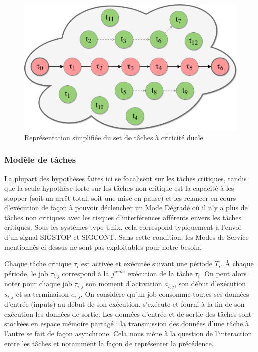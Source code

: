 \documentclass[french, a4paper, 11pt, twoside, pdftex]{StyleThese}
\begin{document}
    	\begin{figure}[th]
    		\centering
    		\includegraphics[width=0.8\linewidth]{schemas/SetDeTaches}
    		\caption{Représentation simplifiée du set de tâches à criticité duale}
    		\label{fig:SetdeTaches}
    	\end{figure}
    	
    	
    	\subsubsection{Modèle de tâches}
		La plupart des hypothèses faites ici se focalisent sur les tâches critiques, tandis que la seule hypothèse forte sur les tâches non critique est la capacité à les stopper (soit un arrêt total, soit une mise en pause) et les relancer en cours d'exécution de façon à pouvoir déclencher un Mode Dégradé où il n'y a plus de tâches non critiques avec les risques d'interférences afférents envers les tâches critiques. Sous les systèmes type Unix, cela correspond typiquement à l'envoi d'un signal SIGSTOP et SIGCONT. Sans cette condition, les Modes de Service mentionnés ci-dessus ne sont pas exploitables pour notre besoin. 
		
		Chaque tâche critique $\tau_i$ est activée et exécutée suivant une période $T_i$. 
		À chaque période, le job $\tau_{i,j}$ correspond à la $j^{ieme}$ exécution de la tâche $\tau_i$. 
		On peut alors noter pour chaque job $\tau_{i,j}$ son moment d'activation $a_{i,j}$, son début d'exécution $s_{i,j}$ et sa terminaison $e_{i,j}$. 
		On considère qu'un job consomme toutes ses données d'entrée (inputs) au début de son exécution, s'exécute et fourni à la fin de son exécution les données de sortie. Les données d'entrée et de sortie des tâches sont stockées en espace mémoire partagé : la transmission des données d'une tâche à l'autre se fait de façon asynchrone.
		Cela nous mène à la question de l'interaction entre les tâches et notamment la façon de représenter la précédence.
    	
\end{document}
